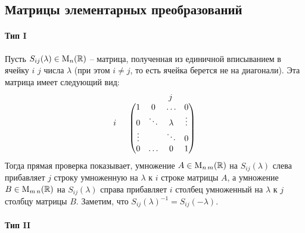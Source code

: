 \subsection{Матрицы элементарных преобразований}
\label{section::ElemMat}

\paragraph{Тип I}

Пусть $S_{ij}(\lambda)\in\operatorname{M}_{n}(\mathbb R)$ -- матрица, полученная из единичной вписыванием в ячейку $i$ $j$ числа $\lambda$ (при этом $i\neq j$, то есть ячейка берется не на диагонали).
Эта матрица имеет следующий вид:
\[
\begin{tabular}{cc}
{}&{\quad \quad $j$}\\
{
$
\begin{matrix}
{}\\{i}\\{}\\{}
\end{matrix}
$}&{
$
\begin{pmatrix}
{1}&{0}&{\ldots}&{0}\\
{0}&{\ddots}&{\lambda}&{\vdots}\\
{\vdots}&{}&{\ddots}&{0}\\
{0}&{\ldots}&{0}&{1}\\
\end{pmatrix}
$
}
\end{tabular}
\]
Тогда прямая проверка показывает, умножение $A\in\operatorname{M}_{n\,m}(\mathbb R)$ на $S_{ij}(\lambda)$ слева прибавляет $j$ строку умноженную на $\lambda$ к $i$ строке матрицы $A$, а умножение $B\in\operatorname{M}_{m\,n}(\mathbb R)$ на $S_{ij}(\lambda)$ справа прибавляет $i$ столбец умноженный на $\lambda$ к $j$ столбцу матрицы $B$.
Заметим, что $S_{ij}(\lambda)^{-1} = S_{ij}(-\lambda)$.

\paragraph{Тип II}


